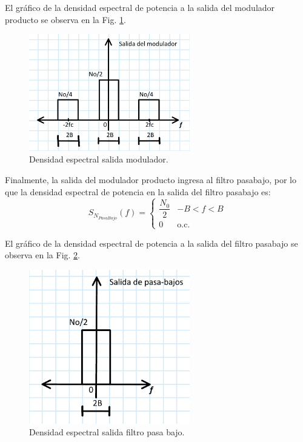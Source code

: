 	\noindent El gráfico de la densidad espectral de potencia a la salida del modulador producto se observa en la Fig. \ref{fig:6modulador}.


		\begin{figure}[H]
			\centering
			\includegraphics[width=7cm]{parte_teorica/actividad6_modulador.jpg}
			\caption{Densidad espectral salida modulador.}
			\label{fig:6modulador}
		\end{figure}



	\noindent Finalmente, la salida del modulador producto ingresa al filtro pasabajo, por lo que la densidad espectral de potencia en la salida del 
	filtro pasabajo es:
		\[
				S_{N_{PasaBajo}}(f) =
				\begin{cases}
				\dfrac{N_0}{2} & -B < f < B \\[6pt]
				0 & \text{o.c.}
				\end{cases}
		\]

	\noindent El gráfico de la densidad espectral de potencia a la salida del filtro pasabajo se observa en la Fig. \ref{fig:6pasabajo}.
    
		\begin{figure}[H]
			\centering
			\includegraphics[width=7cm]{parte_teorica/actividad6_pasabajo.jpg}
			\caption{Densidad espectral salida filtro pasa bajo.}
			\label{fig:6pasabajo}
		\end{figure}

